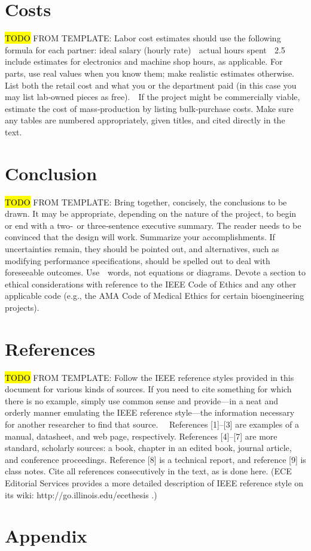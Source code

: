 \documentclass[letterpaper,10pt]{article}
\begin{document}
\begin{spacing}{1.15}
\section{Costs}
\hl{TODO}
FROM TEMPLATE: Labor cost estimates should use the following formula for each partner:
ideal salary (hourly rate)  actual hours spent  2.5 include estimates for electronics and machine shop hours, as applicable. For parts, use real values when you know them; make realistic estimates otherwise. List both the retail cost and what you or the department paid (in this case you may list lab‐owned pieces as free).  If the project might be commercially viable, estimate the cost of mass‐production by listing bulk‐purchase costs. Make sure any tables are numbered appropriately, given titles, and cited directly in the text.  

\section{Conclusion}
\hl{TODO}
FROM TEMPLATE: Bring together, concisely, the conclusions to be drawn. It may be appropriate, depending on the nature of the project, to begin or end with a two‐ or three‐sentence executive summary. The reader needs to be convinced that the design will work. Summarize your accomplishments. If uncertainties remain, they should be pointed out, and alternatives, such as modifying performance specifications, should be spelled out to deal with foreseeable outcomes. Use  words, not equations or diagrams. Devote a section to ethical considerations with reference to the IEEE Code of Ethics and any other applicable code (e.g., the AMA Code of Medical Ethics for certain bioengineering projects).

\section{References}
\hl{TODO}
FROM TEMPLATE: Follow the IEEE reference styles provided in this document for various kinds of sources. If you need to cite something for which there is no example, simply use common sense and provide—in a neat and orderly manner emulating the IEEE reference style—the information necessary for another researcher to find that source.   References [1]–[3] are examples of a manual, datasheet, and web page, respectively. References [4]–[7] are more standard, scholarly sources: a book, chapter in an edited book, journal article, and conference proceedings. Reference [8] is a technical report, and reference [9] is class notes. Cite all references
consecutively in the text, as is done here. (ECE Editorial Services provides a more detailed description of IEEE reference style on its wiki: http://go.illinois.edu/ecethesis .)

\clearpage

\clearpage
\section*{Appendix}

\end{spacing}
\end{document}
